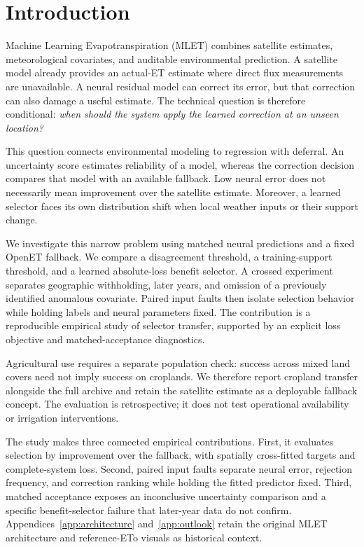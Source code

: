 \documentclass[10pt,letterpaper]{article}
\begin{document}
\section{Introduction}
Machine Learning Evapotranspiration (MLET) combines satellite estimates, meteorological covariates, and auditable environmental prediction.
A satellite model already provides an actual-ET estimate where direct flux measurements are unavailable.
A neural residual model can correct its error, but that correction can also damage a useful estimate.
The technical question is therefore conditional: \emph{when should the system apply the learned correction at an unseen location?}

This question connects environmental modeling to regression with deferral.
An uncertainty score estimates reliability of a model, whereas the correction decision compares that model with an available fallback.
Low neural error does not necessarily mean improvement over the satellite estimate.
Moreover, a learned selector faces its own distribution shift when local weather inputs or their support change.

We investigate this narrow problem using matched neural predictions and a fixed OpenET fallback.
We compare a disagreement threshold, a training-support threshold, and a learned absolute-loss benefit selector.
A crossed experiment separates geographic withholding, later years, and omission of a previously identified anomalous covariate.
Paired input faults then isolate selection behavior while holding labels and neural parameters fixed.
The contribution is a reproducible empirical study of selector transfer, supported by an explicit loss objective and matched-acceptance diagnostics.

Agricultural use requires a separate population check: success across mixed land covers need not imply success on croplands.
We therefore report cropland transfer alongside the full archive and retain the satellite estimate as a deployable fallback concept.
The evaluation is retrospective; it does not test operational availability or irrigation interventions.

The study makes three connected empirical contributions.
First, it evaluates selection by improvement over the fallback, with spatially cross-fitted targets and complete-system loss.
Second, paired input faults separate neural error, rejection frequency, and correction ranking while holding the fitted predictor fixed.
Third, matched acceptance exposes an inconclusive uncertainty comparison and a specific benefit-selector failure that later-year data do not confirm.
Appendices~\ref{app:architecture} and~\ref{app:outlook} retain the original MLET architecture and reference-ETo visuals as historical context.
\clearpage\twocolumn
\end{document}
